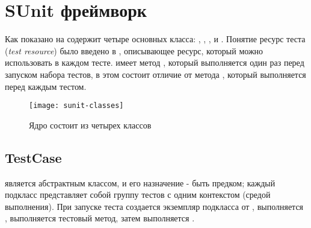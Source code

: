 \documentclass[a4paper,10pt,twoside]{book}
\begin{document}
\section{SUnit фреймворк}

Как показано на  \SUnit содержит четыре основных класса: ,
, , и .
Понятие ресурс теста (\emph{test resource}) было введено в , 
описывающее ресурс, который можно использовать в каждом тесте.
 имеет метод , который выполняется один раз перед запуском набора тестов,
в этом состоит отличие от метода , который выполняется перед каждым тестом.

\begin{figure}[htb]
  \begin{center}
		{\texttt{[image: sunit-classes]}}
	\caption{Ядро \SUnit состоит из четырех классов}
  \end{center}
\end{figure}


\subsection{TestCase}

 является абстрактным классом, и его назначение - быть предком;
каждый подкласс представляет собой группу тестов с одним контекстом (средой выполнения).
При запуске теста создается экземпляр подкласса от ,
выполняется , выполняется тестовый метод, затем выполняется .
\end{document}
